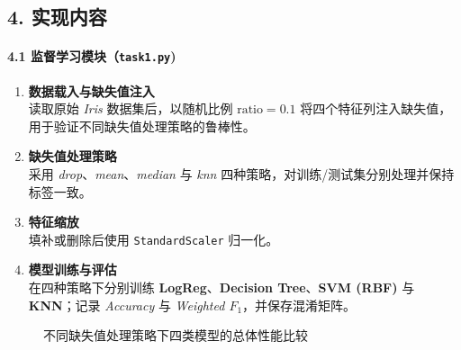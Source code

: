 \documentclass[UTF8]{ctexart}
\begin{document}
\subsection*{4. 实现内容}

\paragraph{4.1 监督学习模块（\texttt{task1.py})}
\begin{enumerate}[label=\arabic*)]
    \item \textbf{数据载入与缺失值注入}\\
          读取原始 \emph{Iris} 数据集后，以随机比例 \(\text{ratio}=0.1\) 将四个特征列注入缺失值，用于验证不同缺失值处理策略的鲁棒性。
    \item \textbf{缺失值处理策略}\\
          采用 \textit{drop}、\textit{mean}、\textit{median} 与 \textit{knn} 四种策略，对训练/测试集分别处理并保持标签一致。
    \item \textbf{特征缩放}\\
          填补或删除后使用 \texttt{StandardScaler} 归一化。
    \item \textbf{模型训练与评估}\\
          在四种策略下分别训练 \textbf{LogReg}、\textbf{Decision Tree}、\textbf{SVM (RBF)} 与 \textbf{KNN}；记录 \emph{Accuracy} 与 \emph{Weighted \(F_1\)}，并保存混淆矩阵。
\end{enumerate}

\begin{figure}[htbp]
    \centering
    \hfill
    \caption{不同缺失值处理策略下四类模型的总体性能比较}
    \label{fig:acc_f1_bar}
\end{figure}
\end{document}
